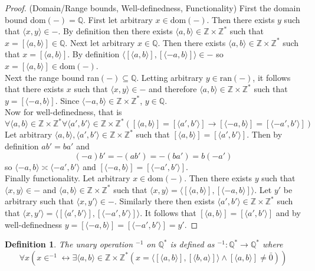 \documentclass{report}
\newtheorem{definition}[theo]{Definition}
\begin{document}
\begin{proof}(Domain/Range bounds, Well-definedness, Functionality)
First the domain bound dom$(-)=\mathbb Q$. First let arbitrary $x\in\text{dom}(-)$. Then there exists $y$ such that $\langle x,y\rangle\in-$. By definition then 
there exists $\langle a,b\rangle\in\mathbb Z\times\mathbb Z^*$ such that 
$x=[\langle a,b\rangle]\in\mathbb Q$. Next let arbitrary $x\in\mathbb Q$. Then 
there exists $\langle a,b\rangle\in\mathbb Z\times\mathbb Z^*$ such that 
$x=[\langle a,b\rangle]$. By definition $\langle[\langle a,b\rangle],[\langle -a,b\rangle]\rangle\in -$ so $x=[\langle a,b\rangle]\in\text{dom}(-)$.\\
\indent Next the range bound ran$(-)\subseteq\mathbb Q$. Letting arbitrary $y\in\text{ran}(-)$, it follows that there exists $x$ such that $\langle x,y\rangle\in-$ and therefore
$\langle a,b\rangle\in\mathbb Z\times\mathbb Z^*$ such that $y=[\langle -a,b\rangle]$. Since $\langle -a,b\rangle\in\mathbb Z\times\mathbb Z^*$, $y\in\mathbb Q$.\\
\indent Now for well-definedness, that is
\begin{equation*}
\forall\langle a,b\rangle\in\mathbb Z\times\mathbb Z^*
\forall\langle a',b'\rangle\in\mathbb Z\times\mathbb Z^*([\langle a,b\rangle]=[\langle a',b'\rangle]\to[\langle -a,b\rangle]=[\langle -a',b'\rangle])
\end{equation*}
Let arbitrary $\langle a,b\rangle,\langle a',b'\rangle\in\mathbb Z\times\mathbb Z^*$ such that 
$[\langle a,b\rangle]=[\langle a',b'\rangle]$. Then by definition $ab'=ba'$ and
\begin{equation*}
(-a)b'=-(ab')=-(ba')=b(-a')
\end{equation*}
so $\langle -a,b\rangle\asymp\langle -a',b'\rangle$ and 
$[\langle -a,b\rangle]=[\langle -a',b'\rangle]$.\\
\indent Finally functionality. Let arbitrary $x\in\text{dom}(-)$. Then there exists $y$ such that $\langle x,y\rangle\in-$ and $\langle a,b\rangle\in\mathbb Z\times\mathbb Z^*$ such that 
$\langle x,y\rangle=\langle[\langle a,b\rangle],[\langle -a,b\rangle]\rangle$. Let $y'$ be arbitrary such that $\langle x,y'\rangle\in-$. Similarly there
then exists $\langle a',b'\rangle\in\mathbb Z\times\mathbb Z^*$ such that 
$\langle x,y'\rangle=\langle[\langle a',b'\rangle],[\langle -a',b'\rangle]\rangle$.
It follows that $[\langle a,b\rangle]=[\langle a',b'\rangle]$ and by well-definedness $y=[\langle -a,b\rangle]=[\langle -a',b'\rangle]=y'$.
\end{proof}
\begin{definition}
The unary operation $^{-1}$ on $\mathbb Q^*$ is defined as $^{-1}:\mathbb Q^*\to\mathbb Q^*$ where
\begin{equation*}
\forall x(x\in^{-1}\leftrightarrow\exists\langle a,b\rangle\in\mathbb Z\times\mathbb Z^*(x=\langle[\langle a,b\rangle],[\langle b,a\rangle]\rangle\land [\langle a,b\rangle]\neq\bar0))
\end{equation*}
\end{definition}
\end{document}
